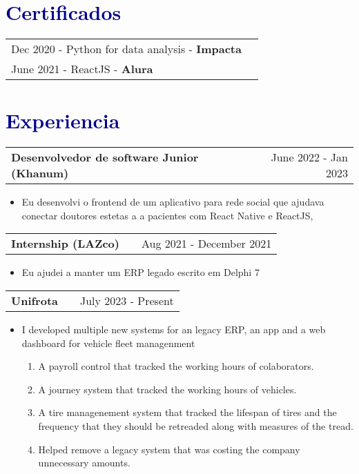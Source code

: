 \documentclass[a4paper,12pt]{article}
\makeatletter
\newenvironment{joblong}[2]
    {
    \begin{tabularx}{\linewidth}{@{}l X r@{}}
    \textbf{#1} & \hfill &  #2 \\[3.75pt]
    \end{tabularx}
    \begin{minipage}[t]{\linewidth}
    \begin{itemize}[nosep,after=\strut, leftmargin=1em, itemsep=3pt,label=--]
    }
    {
    \end{itemize}
    \end{minipage}    
    }
\makeatother
\begin{document}
\section{{\textcolor{darkblue}{\textbf{Certificados}}}}
\begin{tabularx}{\linewidth}{@{}l X@{}}	

Dec 2020 - Python for data analysis  - \textbf{Impacta} \\

June 2021 - ReactJS - \textbf{Alura} \\

\end{tabularx}


\section{\textcolor{darkblue}{\textbf{Experiencia}}}

\begin{joblong}{Desenvolvedor de software Junior (Khanum)}{June 2022 - Jan 2023}
\item Eu desenvolvi o frontend de um aplicativo para rede social que ajudava conectar doutores estetas a 
a pacientes com React Native e ReactJS,
\end{joblong}

\begin{joblong}{Internship (LAZco)}{Aug 2021 - December 2021}
\item Eu ajudei a manter um ERP legado escrito em Delphi 7 
	
\end{joblong}

\begin{joblong}{Unifrota}{July 2023 - Present}
\item I developed multiple new systems for an legacy ERP, an app and a web dashboard for vehicle fleet managenment 
	\begin{enumerate}
		\item A payroll control that tracked the working hours of colaborators.
		\item A journey system that tracked the working hours of vehicles.
		\item A tire managenement system that tracked the lifespan of tires and the frequency that they should be retreaded along with measures of the tread.
		\item  Helped remove a legacy system that was costing the company unnecessary amounts.
	\end{enumerate}
	
\end{joblong}
\end{document}
